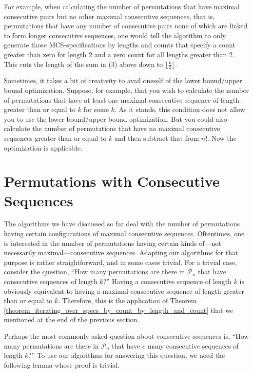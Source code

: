 \documentclass{article}
\begin{document}
For example, when
calculating the number of permutations that have maximal consecutive pairs but no other maximal
consecutive sequences, that is, permutations that have any number of consecutive pairs none of
which are linked to form longer consecutive sequences, one would tell the algorithm
to only generate those MCS-specifications by lengths and counts that specify a count greater than zero
for length 2 and a zero count for all lengths greater than 2. This cuts the length of the sum in (3)
above down to $\lfloor\frac{n}{2}\rfloor$. 

Sometimes, it takes a bit of creativity to avail oneself of the lower bound/upper bound optimization. Suppose,
for example, that you wish to calculate the number of permutations that have at least one maximal consecutive
sequence of length greater than or equal to $k$ for some $k$.
As it stands, this condition does not allow you to use the lower bound/upper bound optimization.
But you could also calculate the number of permutations that have no maximal consecutive sequences
greater than or equal to $k$ and then subtract that from $n!$. Now the optimization is applicable.

\section{Permutations with Consecutive Sequences}
The algorithms we have discussed so far deal with the number of permutations having certain configurations
of maximal consecutive sequences. Oftentimes, one is interested in the number of permutations having certain
kinds of---not necessarily maximal---consecutive sequences. Adapting our algorithms for that purpose is
rather straightforward, and in some cases trivial. For a trivial case, consider the question, ``How many
permutations are there in ${\mathcal P}_n$ that have consecutive sequences of length $k$?'' Having a
consecutive sequence of length $k$ is obviously equivalent to having a maximal consecutive sequence of
length greater than or equal to $k$. Therefore, this is the application of Theorem
\ref{theorem_iterating_over_specs_by_count_by_length_and_count} that we mentioned at the end of the
previous section.

Perhaps the most commonly asked question about consecutive sequences is, ``How many
permutations are there in ${\mathcal P}_n$ that have $c$ many consecutive sequences of length $k$?''
To use our algorithms for answering this question, we need the following lemma whose proof is trivial.
\end{document}
